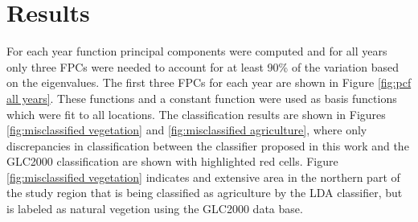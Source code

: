 %
%



\section{Results} 
For each year function principal components were computed and for all years only three FPCs were needed to account for at least 90\% of the variation based on the eigenvalues. The first three FPCs for each year are shown in Figure \ref{fig:pcf all years}. These functions and a constant function were used as basis functions which were fit to all locations. The classification results are shown in Figures \ref{fig:misclassified vegetation} and \ref{fig:misclassified agriculture}, where only discrepancies in classification between the classifier proposed in this work and the GLC2000 classification are shown with highlighted red cells. Figure \ref{fig:misclassified vegetation} indicates and extensive area in the northern part of the study region that is being classified as agriculture by the LDA classifier, but is labeled as natural vegetion using the GLC2000 data base. 

